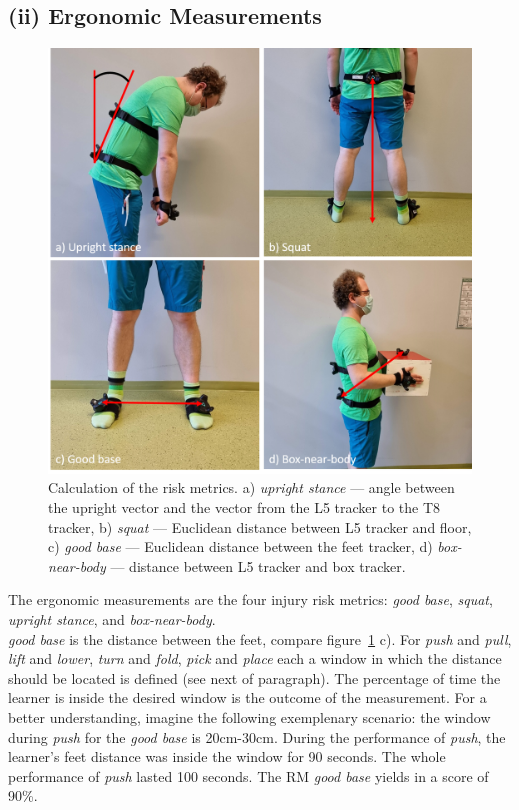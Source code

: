 \subsection{(ii) Ergonomic Measurements}
\label{sec:ergonomicMeasurements}
\begin{figure}[H]
	\centering
	\includegraphics[width=\textwidth]{figures/riskMeasurements.png}
	\caption[Risk metrics calculation]{Calculation of the risk metrics. a) \textit{upright stance} --- angle between the upright vector and the vector from the L5 tracker to the T8 tracker, b) \textit{squat} --- Euclidean distance between L5 tracker and floor, c) \textit{good base} --- Euclidean distance between the feet tracker, d) \textit{box-near-body} --- distance between L5 tracker and box tracker.}
	\label{fig:rmCalc}
\end{figure}
The ergonomic measurements are the four injury risk metrics: \textit{good base}, \textit{squat}, \textit{upright stance}, and \textit{box-near-body}.\\
\textit{good base} is the distance between the feet, compare figure~\ref{fig:rmCalc} c). For \textit{push} and \textit{pull}, \textit{lift} and \textit{lower}, \textit{turn} and \textit{fold}, \textit{pick} and \textit{place} each a window in which the distance should be located is defined (see next of paragraph). The percentage of time the learner is inside the desired window is the outcome of the measurement. For a better understanding, imagine the following exemplenary  scenario: the window during \textit{push} for the \textit{good base} is 20cm-30cm. During the performance of \textit{push}, the learner's feet distance was inside the window for 90 seconds. The whole performance of \textit{push} lasted 100 seconds. The RM \textit{good base} yields in a score of 90\%.\\
